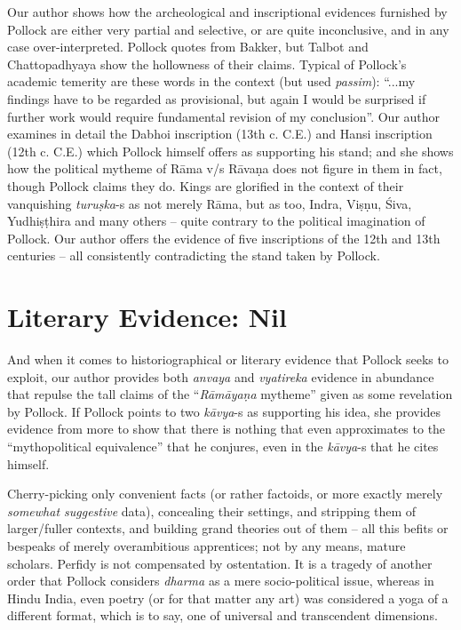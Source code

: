 Our author shows how the archeological and inscriptional evidences furnished by Pollock are either very partial and selective, or are quite inconclusive, and in any case over-interpreted. Pollock quotes from Bakker, but Talbot and Chattopadhyaya show the hollowness of their claims. Typical of Pollock’s academic temerity are these words in the context (but used {\sl passim}): “...my findings have to be regarded as provisional, but again I would be surprised if further work would require fundamental revision of my conclusion”. Our author examines in detail the Dabhoi inscription (13th c. C.E.) and Hansi inscription (12th c. C.E.) which Pollock himself offers as supporting his stand; and she shows how the political mytheme of Rāma v/s Rāvaṇa does not figure in them in fact, though Pollock claims they do. Kings are glorified in the context of their vanquishing {\sl turuṣka}-s as not merely Rāma, but as too, Indra, Viṣṇu, Śiva, Yudhiṣṭhira and many others -- quite contrary to the political imagination of Pollock. Our author offers the evidence of five inscriptions of the 12th and 13th centuries -- all consistently contradicting the stand taken by Pollock.

\section*{Literary Evidence: Nil}

And when it comes to historiographical or literary evidence that Pollock seeks to exploit, our author provides both {\sl anvaya} and {\sl vyatireka} evidence in abundance that repulse the tall claims of  the “{\sl Rāmāyaṇa} mytheme” given as some revelation by Pollock. If Pollock points to two {\sl kāvya}-s as supporting his idea, she provides evidence from more to show that there is nothing that even approximates to the “mythopolitical equivalence” that he conjures, even in the {\sl kāvya}-s that he cites himself.

Cherry-picking only convenient facts (or rather factoids, or more exactly merely {\sl somewhat suggestive} data), concealing their settings, and stripping them of larger/fuller contexts, and building grand theories out of them -- all this befits or bespeaks of merely overambitious apprentices; not by any means, mature scholars. Perfidy is not compensated by ostentation. It is a tragedy of another order that Pollock considers {\sl dharma} as a mere socio-political issue, whereas in Hindu India, even poetry (or for that matter any art) was considered a yoga of a different format, which is to say, one of universal and transcendent dimensions. 

